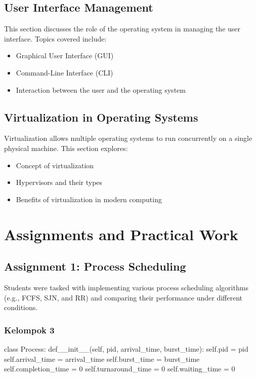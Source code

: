 \documentclass[12pt]{article}
\begin{document}
\subsection{User Interface Management}
This section discusses the role of the operating system in managing the user interface. Topics covered include:
\begin{itemize}
    \item Graphical User Interface (GUI)
    \item Command-Line Interface (CLI)
    \item Interaction between the user and the operating system
\end{itemize}

\subsection{Virtualization in Operating Systems}
Virtualization allows multiple operating systems to run concurrently on a single physical machine. This section explores:
\begin{itemize}
    \item Concept of virtualization
    \item Hypervisors and their types
    \item Benefits of virtualization in modern computing
\end{itemize}

\section{Assignments and Practical Work}
\subsection{Assignment 1: Process Scheduling}
Students were tasked with implementing various process scheduling algorithms (e.g., FCFS, SJN, and RR) and comparing their performance under different conditions.
\subsubsection{Kelompok 3}
\begin{python}
class Process:
    def__init__(self, pid, arrival_time, burst_time):
        self.pid = pid
        self.arrival_time = arrival_time
        self.burst_time = burst_time
        self.completion_time = 0
        self.turnaround_time = 0
        self.waiting_time = 0
\end{python}
\end{document}
